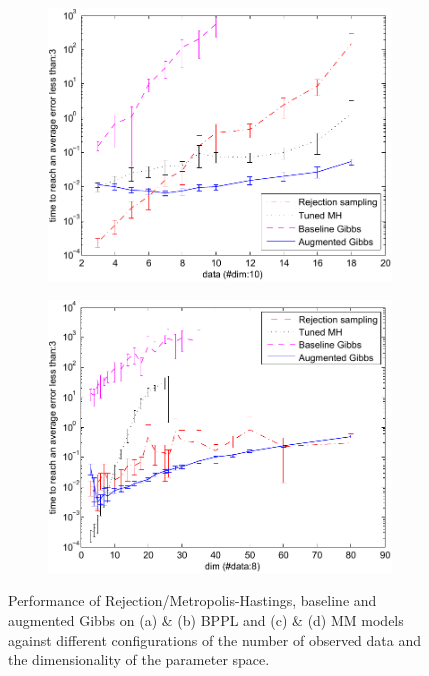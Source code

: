 \begin{figure} 
\centering
\begin{subfigure}{.45\textwidth}
  \centering
  \includegraphics[width=1.00\textwidth]{plot/mmm_data_analysis2.pdf}
  \caption{}
  \label{fig:mmm_data_analysis}
\end{subfigure}
\begin{subfigure}{.45\textwidth}
  \centering
  \includegraphics[width=1.00\textwidth]{plot/mmm_dim_analysis10.pdf}
  \caption{}
  \label{fig:mmm_dim_analysis}
\end{subfigure}
\caption{Performance of Rejection/Metropolis-Hastings, baseline and augmented Gibbs on (a) \& (b) BPPL and (c) \& (d) MM models against different configurations of the number of observed data and the dimensionality of the parameter space.}
\label{fig:results}
\end{figure}

